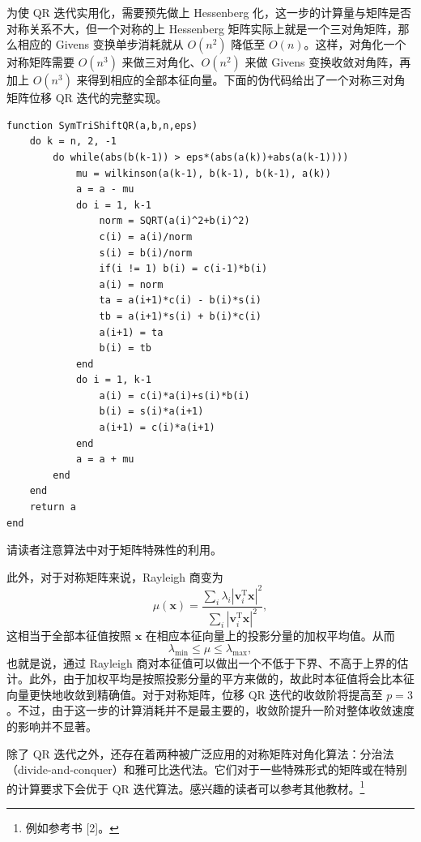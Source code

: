 为使 QR 迭代实用化，需要预先做上 Hessenberg 化，这一步的计算量与矩阵是否对称关系不大，但一个对称的上 Hessenberg 矩阵实际上就是一个三对角矩阵，那么相应的 Givens 变换单步消耗就从 $O(n^2)$ 降低至 $O(n)$。这样，对角化一个对称矩阵需要 $O(n^3)$ 来做三对角化、$O(n^2)$ 来做 Givens 变换收敛对角阵，再加上 $O(n^3)$ 来得到相应的全部本征向量。下面的伪代码给出了一个对称三对角矩阵位移 QR 迭代的完整实现。

\begin{algorithmBox}
\begin{lstlisting}[style=bellacode]
function SymTriShiftQR(a,b,n,eps)
    do k = n, 2, -1
        do while(abs(b(k-1)) > eps*(abs(a(k))+abs(a(k-1))))
            mu = wilkinson(a(k-1), b(k-1), b(k-1), a(k))
            a = a - mu
            do i = 1, k-1
                norm = SQRT(a(i)^2+b(i)^2)
                c(i) = a(i)/norm
                s(i) = b(i)/norm
                if(i != 1) b(i) = c(i-1)*b(i)
                a(i) = norm
                ta = a(i+1)*c(i) - b(i)*s(i)
                tb = a(i+1)*s(i) + b(i)*c(i)
                a(i+1) = ta
                b(i) = tb
            end
            do i = 1, k-1
                a(i) = c(i)*a(i)+s(i)*b(i)
                b(i) = s(i)*a(i+1)
                a(i+1) = c(i)*a(i+1)
            end
            a = a + mu
        end
    end
    return a
end
\end{lstlisting}
\end{algorithmBox}

请读者注意算法中对于矩阵特殊性的利用。

此外，对于对称矩阵来说，Rayleigh 商变为
\begin{equation}
\mu(\bm x)=\frac{\sum_i\lambda_i|\bm v_i^{\mathrm T}\bm x|^2}{\sum_i|\bm v_i^{\mathrm T}\bm x|^2},
\tag{3.4.32}
\end{equation}
这相当于全部本征值按照 $\bm x$ 在相应本征向量上的投影分量的加权平均值。从而
\begin{equation}
\lambda_{\min}\le\mu\le\lambda_{\max},
\tag{3.4.33}
\end{equation}
也就是说，通过 Rayleigh 商对本征值可以做出一个不低于下界、不高于上界的估计。此外，由于加权平均是按照投影分量的平方来做的，故此时本征值将会比本征向量更快地收敛到精确值。对于对称矩阵，位移 QR 迭代的收敛阶将提高至 $p=3$。不过，由于这一步的计算消耗并不是最主要的，收敛阶提升一阶对整体收敛速度的影响并不显著。

除了 QR 迭代之外，还存在着两种被广泛应用的对称矩阵对角化算法：分治法（divide-and-conquer）和雅可比迭代法。它们对于一些特殊形式的矩阵或在特别的计算要求下会优于 QR 迭代算法。感兴趣的读者可以参考其他教材。\footnote{例如参考书 [2]。}

